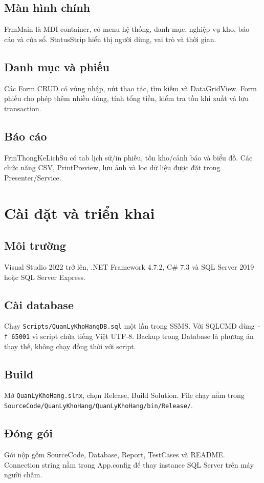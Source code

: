 \documentclass[12pt,a4paper]{report}
\newcommand{\code}[1]{\texttt{#1}}
\begin{document}
\section{Màn hình chính}
FrmMain là MDI container, có menu hệ thống, danh mục, nghiệp vụ kho, báo cáo và
cửa sổ. StatusStrip hiển thị người dùng, vai trò và thời gian.
\section{Danh mục và phiếu}
Các Form CRUD có vùng nhập, nút thao tác, tìm kiếm và DataGridView. Form phiếu
cho phép thêm nhiều dòng, tính tổng tiền, kiểm tra tồn khi xuất và lưu transaction.
\section{Báo cáo}
FrmThongKeLichSu có tab lịch sử/in phiếu, tồn kho/cảnh báo và biểu đồ. Các chức
năng CSV, PrintPreview, lưu ảnh và lọc dữ liệu được đặt trong Presenter/Service.

\chapter{Cài đặt và triển khai}
\section{Môi trường}
Visual Studio 2022 trở lên, .NET Framework 4.7.2, C\# 7.3 và SQL Server 2019
hoặc SQL Server Express.
\section{Cài database}
Chạy \code{Scripts/QuanLyKhoHangDB.sql} một lần trong SSMS. Với SQLCMD dùng
\code{-f 65001} vì script chứa tiếng Việt UTF-8. Backup trong Database là phương
án thay thế, không chạy đồng thời với script.
\section{Build}
Mở \code{QuanLyKhoHang.slnx}, chọn Release, Build Solution. File chạy nằm trong
\code{SourceCode/QuanLyKhoHang/QuanLyKhoHang/bin/Release/}.
\section{Đóng gói}
Gói nộp gồm SourceCode, Database, Report, TestCases và README. Connection string
nằm trong App.config để thay instance SQL Server trên máy người chấm.
\end{document}
